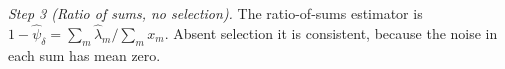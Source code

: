 \emph{Step 3 (Ratio of sums, no selection).} The ratio-of-sums estimator is $1-\hat\psi_\delta=\sum_m\hat\lambda_m/\sum_mx_m$. Absent selection it is consistent, because the noise in each sum has mean zero.
